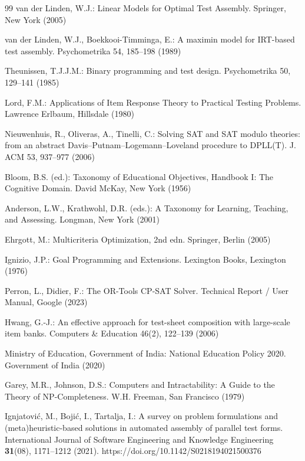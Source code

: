 \documentclass[runningheads]{llncs}
\begin{document}
\begin{thebibliography}{99}
van der Linden, W.J.: Linear Models for Optimal Test Assembly. Springer, New York (2005)

van der Linden, W.J., Boekkooi-Timminga, E.: A maximin model for IRT-based test assembly. Psychometrika 54, 185--198 (1989)

Theunissen, T.J.J.M.: Binary programming and test design. Psychometrika 50, 129--141 (1985)

Lord, F.M.: Applications of Item Response Theory to Practical Testing Problems. Lawrence Erlbaum, Hillsdale (1980)

Nieuwenhuis, R., Oliveras, A., Tinelli, C.: Solving SAT and SAT modulo theories: from an abstract Davis--Putnam--Logemann--Loveland procedure to DPLL(T). J. ACM 53, 937--977 (2006)

Bloom, B.S. (ed.): Taxonomy of Educational Objectives, Handbook I: The Cognitive Domain. David McKay, New York (1956)

Anderson, L.W., Krathwohl, D.R. (eds.): A Taxonomy for Learning, Teaching, and Assessing. Longman, New York (2001)

Ehrgott, M.: Multicriteria Optimization, 2nd edn. Springer, Berlin (2005)

Ignizio, J.P.: Goal Programming and Extensions. Lexington Books, Lexington (1976)

Perron, L., Didier, F.: The OR-Tools CP-SAT Solver. Technical Report / User Manual, Google (2023)

Hwang, G.-J.: An effective approach for test-sheet composition with large-scale item banks. Computers \& Education 46(2), 122--139 (2006)

Ministry of Education, Government of India: National Education Policy 2020. Government of India (2020)

Garey, M.R., Johnson, D.S.: Computers and Intractability: A Guide to the Theory of NP-Completeness. W.H. Freeman, San Francisco (1979)

Ignjatovi\'c, M., Boji\'c, I., Tartalja, I.: A survey on problem formulations and (meta)heuristic-based solutions in automated assembly of parallel test forms. International Journal of Software Engineering and Knowledge Engineering \textbf{31}(08), 1171--1212 (2021). https://doi.org/10.1142/S0218194021500376


\end{thebibliography}
\end{document}
